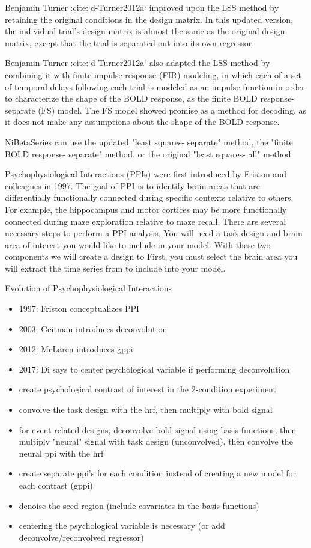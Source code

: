 \documentclass[phd,appendix,figures]{uithesis}
\begin{document}
\begin{itemize}
Benjamin Turner :cite:`d-Turner2012a` improved upon the LSS method by retaining
the original conditions in the design matrix.
In this updated version, the individual trial's design matrix is almost the same
as the original design matrix, except that the trial is separated out into its
own regressor.

Benjamin Turner :cite:`d-Turner2012a` also adapted the LSS method by combining
it with finite impulse response (FIR) modeling, in which each of a set of
temporal delays following each trial is modeled as an impulse function in order
to characterize the shape of the BOLD response, as the
finite BOLD response- separate (FS) model.
The FS model showed promise as a method for decoding, as it does not make any
assumptions about the shape of the BOLD response.

NiBetaSeries can use the updated "least squares- separate" method,
the "finite BOLD response- separate" method, or the original
"least squares- all" method.


Psychophysiological Interactions (PPIs) were first introduced by Friston and colleagues in 1997.
The goal of PPI is to identify brain areas that are differentially functionally connected
during specific contexts relative to others.
For example, the hippocampus and motor cortices may be more functionally connected
during maze exploration relative to maze recall.
There are several necessary steps to perform a PPI analysis.
You will need a task design and brain area of interest you would like to
include in your model.
With these two components we will create a design to 
First, you must select the brain area you will extract the time series from
to include into your model.


Evolution of Psychophysiological Interactions
\begin{itemize}
	\item 1997: Friston conceptualizes PPI
	\item 2003: Geitman introduces deconvolution
	\item 2012: McLaren introduces gppi
	\item 2017: Di says to center psychological variable if performing deconvolution
	\item create psychological contrast of interest in the 2-condition experiment
	\item convolve the task design with the hrf, then multiply with bold signal
	\item for event related designs, deconvolve bold signal using basis functions,
		  then multiply "neural" signal with task design (unconvolved), then convolve
		  the neural ppi with the hrf
	\item create separate ppi's for each condition instead of creating a new model for each contrast (gppi)
	\item denoise the seed region (include covariates in the basis functions)
	\item centering the psychological variable is necessary (or add deconvolve/reconvolved regressor)
	       

\end{itemize}
\end{itemize}
\end{document}
